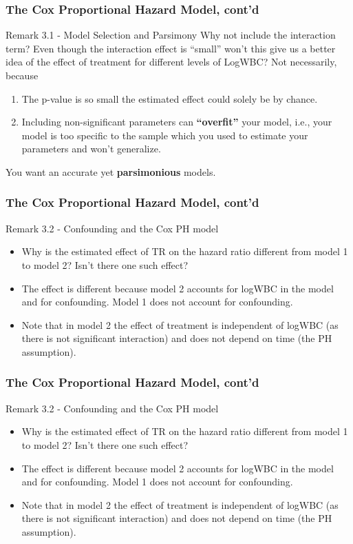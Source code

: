 \documentclass{beamer}
\theoremstyle{definition}
\begin{document}
\begin{frame}
\frametitle{The Cox Proportional Hazard Model, cont'd}
\begin{block}{Remark 3.1 - Model Selection and Parsimony}
Why not include the interaction term? Even though the interaction effect is ``small'' won't this give us a better idea of the effect of treatment for different levels of LogWBC? Not necessarily, because
\begin{enumerate}
\item The p-value is so small the estimated effect could solely be by chance.
\item Including non-significant parameters can \textbf{``overfit''} your model, i.e., your model is too specific to the sample which you used to estimate your parameters and won't generalize.
\end{enumerate}
You want an accurate yet \textbf{parsimonious} models.
\end{block}
\end{frame}

\begin{frame}
\frametitle{The Cox Proportional Hazard Model, cont'd}
\begin{block}{Remark 3.2 - Confounding and the Cox PH model}
\begin{itemize}
\item  Why is the estimated effect of TR on the hazard ratio different from model 1 to model 2? Isn't there one such effect?
\item The effect is different because model 2 accounts for logWBC in the model and for confounding.  Model 1 does not account for confounding.
\item Note that in model 2 the effect of treatment is independent of logWBC (as there is not significant interaction) and does not depend on time (the PH assumption).
\end{itemize}
\end{block}
\end{frame}

\begin{frame}
\frametitle{The Cox Proportional Hazard Model, cont'd}
\begin{block}{Remark 3.2 - Confounding and the Cox PH model}
\begin{itemize}
\item  Why is the estimated effect of TR on the hazard ratio different from model 1 to model 2? Isn't there one such effect?
\item The effect is different because model 2 accounts for logWBC in the model and for confounding.  Model 1 does not account for confounding.
\item Note that in model 2 the effect of treatment is independent of logWBC (as there is not significant interaction) and does not depend on time (the PH assumption).
\end{itemize}
\end{block}
\end{frame}
\end{document}
